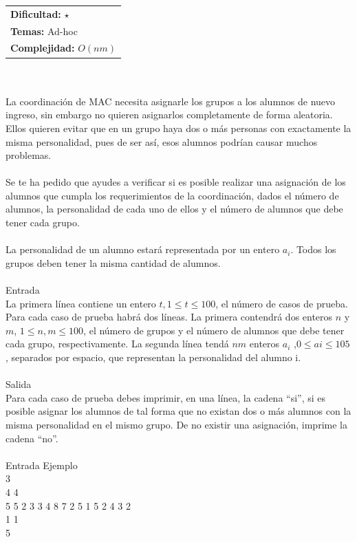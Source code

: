 \documentclass[12pt]{article}
\begin{document}
{{{\hfill
\begin{tabular}{@{}l@{}}
\textbf{Dificultad:} $\star$ \\
\textbf{Temas:} Ad-hoc \\
\textbf{Complejidad:} $O(nm)$
\end{tabular}\\
\\
La coordinación de MAC necesita asignarle los grupos a los alumnos de nuevo ingreso, sin embargo no quieren asignarlos completamente de forma aleatoria. Ellos quieren evitar que en un grupo haya dos o más personas con exactamente la misma personalidad, pues de ser así, esos alumnos podrían causar muchos problemas.\\
\\Se te ha pedido que ayudes a verificar si es posible realizar una asignación de los alumnos que cumpla los requerimientos de la coordinación, dados el número de alumnos, la personalidad de cada uno de ellos y el número de alumnos que debe tener cada grupo.\\
\\La personalidad de un alumno estará representada por un entero $a_i$. Todos los grupos deben tener la misma cantidad de alumnos.
\\
\\
\textrm{\large Entrada}
\\
La primera línea contiene un entero $t, 1 ≤ t ≤ 100$, el número de casos de prueba. Para cada caso de prueba habrá dos líneas. La primera contendrá dos enteros $n$ y $m$, $1 ≤ n, m ≤ 100$, el número de grupos y el número de alumnos que debe tener cada grupo, respectivamente. La segunda línea tendá $nm$ enteros $a_i$ ,$ 0 ≤ ai ≤ 105$ ,
separados por espacio, que representan la personalidad del alumno i.
\\
\\
\textrm{\large Salida}
\\
Para cada caso de prueba debes imprimir, en una línea, la cadena “si”, si es posible asignar los alumnos de tal forma que no existan dos o más alumnos con la misma personalidad en el mismo grupo. De no existir una asignación, imprime la cadena “no”.
\\
\\
\textrm{\large Entrada Ejemplo}
\\
3\\
4 4\\
5 5 2 3 3 4 8 7 2 5 1 5 2 4 3 2\\
1 1\\
5\\
}}}
\end{document}
